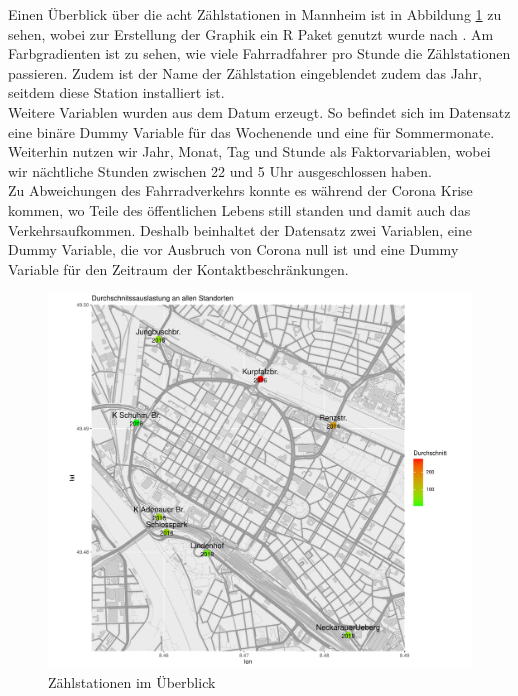 \documentclass[a4paper,12pt]{thesis}
\begin{document}
Einen Überblick über die acht Zählstationen in Mannheim ist in Abbildung \ref{Figure1} zu sehen, wobei zur Erstellung der Graphik ein R Paket genutzt wurde nach \cite{Kahle2013}. Am Farbgradienten ist zu sehen, wie viele Fahrradfahrer pro Stunde die Zählstationen passieren. Zudem ist der Name der Zählstation eingeblendet zudem das Jahr, seitdem diese Station installiert ist.\\
Weitere Variablen wurden aus dem Datum erzeugt. So befindet sich im Datensatz eine binäre Dummy Variable für das Wochenende und eine für Sommermonate. Weiterhin nutzen wir Jahr, Monat, Tag und Stunde als Faktorvariablen, wobei wir nächtliche Stunden zwischen 22 und 5 Uhr ausgeschlossen haben.\\
Zu Abweichungen des Fahrradverkehrs konnte es während der Corona Krise kommen, wo Teile des öffentlichen Lebens still standen und damit auch das Verkehrsaufkommen. Deshalb beinhaltet der Datensatz zwei Variablen, eine Dummy Variable, die vor Ausbruch von Corona null ist und eine Dummy Variable für den Zeitraum der Kontaktbeschränkungen.

\begin{figure}[!ht]
	\centering
	\includegraphics[width=\textwidth]{Plots/Karte_Durchschnittsauslastung.pdf}
	\caption{Zählstationen im Überblick}
	\label{Figure1}
\end{figure}
\end{document}
